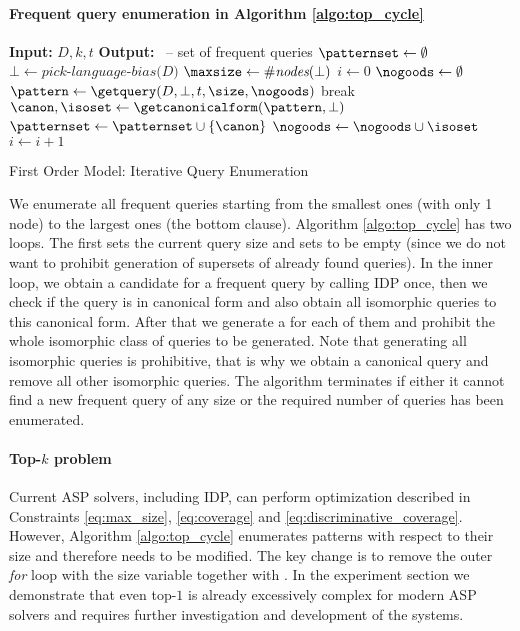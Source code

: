 \paragraph{Frequent query enumeration in Algorithm \ref{algo:top_cycle}}
\begin{algorithm}[thb]
  \begin{algorithmic}
    \footnotesize
    \State \textbf{Input:} $D,k,t$ 
    \State \textbf{Output:} \patternset~-- set of frequent queries
    \State $\patternset \gets \emptyset$
    \State $\bot \gets \textit{pick-language-bias(D)}$ 
    \State $\maxsize \gets \#\textit{nodes}(\bot)$
    \State $i \gets 0$
    \For{$\size \in 1\dots\maxsize$}
    \State $\nogoods \gets \emptyset$
     \label{algo:line:while}
    \State $\pattern \gets \getquery(D,\bot,t,\size,\nogoods)$ 
    \State break 
  \EndIf 
  \State $\canon, \isoset \gets \getcanonicalform(\pattern, \bot)$ 
  \State $\patternset \gets \patternset \cup \{\canon\}$
  \State $\nogoods \gets \nogoods \cup \isoset$
  \State $i \gets i + 1$ 
  \Return \patternset
\EndIf
  \EndWhile
\EndFor\\
\Return \patternset
\end{algorithmic}
\caption{First Order Model: Iterative Query Enumeration}
\label{algo:top_cycle}
\end{algorithm}
We enumerate all frequent queries starting from the smallest ones (with only 1 node) to the largest ones (the bottom clause). Algorithm \ref{algo:top_cycle} has two loops. The first sets the current query size and sets \mic to be empty (since we do not want to prohibit generation of supersets of already found queries). In the inner loop, we obtain a candidate for a frequent query by calling IDP once, then we check if the query is in canonical form and also obtain all isomorphic queries to this canonical form. After that we generate a \mic for each of them and prohibit the whole isomorphic class of queries to be generated. Note that generating all isomorphic queries is prohibitive, that is why we obtain a canonical query and remove all other isomorphic queries. The algorithm terminates if either it cannot find a new frequent query of any size or the required number of queries has been enumerated. 
\paragraph{Top-$k$ problem}
Current ASP solvers, including IDP, can perform optimization described in Constraints \ref{eq:max_size}, \ref{eq:coverage} and \ref{eq:discriminative_coverage}. However, Algorithm \ref{algo:top_cycle} enumerates patterns with respect to their size and therefore needs to be modified. The key change is to remove the outer \textit{for} loop with the size variable together with  \CardinalityConstraint. In the experiment section we demonstrate that even top-$1$ is already excessively complex for modern ASP solvers and requires further investigation and development of the systems. 

